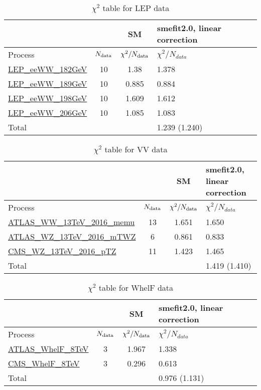\documentclass{article}
\begin{document}
\begin{table}[H]
\centering
\begin{tabular}{|l|c|c|C{3cm}|}
\hline
  & SM& smefit2.0, linear correction\\ \hline
Process & $N_{\rm data}$ & $\chi^ 2/N_{\rm data}$& $\chi^ 2/N_{data}$\\ \hline
\href{https://arxiv.org/abs/1302.3415}{LEP_eeWW_182GeV} & 10 & 1.38 & {\color{black} 1.378} \\ \hline
\href{https://arxiv.org/abs/1302.3415}{LEP_eeWW_189GeV} & 10 & 0.885 & {\color{black} 0.884} \\ \hline
\href{https://arxiv.org/abs/1302.3415}{LEP_eeWW_198GeV} & 10 & 1.609 & {\color{black} 1.612} \\ \hline
\href{https://arxiv.org/abs/1302.3415}{LEP_eeWW_206GeV} & 10 & 1.085 & {\color{black} 1.083} \\ \hline
\hline Total & &  & 1.239 (1.240) \\ \hline
\end{tabular}
\caption{$\chi^2$ table for LEP data}
\end{table}
\begin{table}[H]
\centering
\begin{tabular}{|l|c|c|C{3cm}|}
\hline
  & SM& smefit2.0, linear correction\\ \hline
Process & $N_{\rm data}$ & $\chi^ 2/N_{\rm data}$& $\chi^ 2/N_{data}$\\ \hline
\href{https://arxiv.org/abs/1905.04242}{ATLAS_WW_13TeV_2016_memu} & 13 & 1.651 & {\color{black} 1.650} \\ \hline
\href{https://arxiv.org/abs/1902.05759}{ATLAS_WZ_13TeV_2016_mTWZ} & 6 & 0.861 & {\color{black} 0.833} \\ \hline
\href{https://arxiv.org/abs/1901.03428}{CMS_WZ_13TeV_2016_pTZ} & 11 & 1.423 & {\color{black} 1.465} \\ \hline
\hline Total & &  & 1.419 (1.410) \\ \hline
\end{tabular}
\caption{$\chi^2$ table for VV data}
\end{table}
\begin{table}[H]
\centering
\begin{tabular}{|l|c|c|C{3cm}|}
\hline
  & SM& smefit2.0, linear correction\\ \hline
Process & $N_{\rm data}$ & $\chi^ 2/N_{\rm data}$& $\chi^ 2/N_{data}$\\ \hline
\href{https://arxiv.org/abs/1612.02577}{ATLAS_WhelF_8TeV} & 3 & 1.967 & {\color{black} 1.338} \\ \hline
\href{https://arxiv.org/abs/1605.09047}{CMS_WhelF_8TeV} & 3 & 0.296 & {\color{black} 0.613} \\ \hline
\hline Total & &  & 0.976 (1.131) \\ \hline
\end{tabular}
\caption{$\chi^2$ table for WhelF data}
\end{table}
\end{document}
